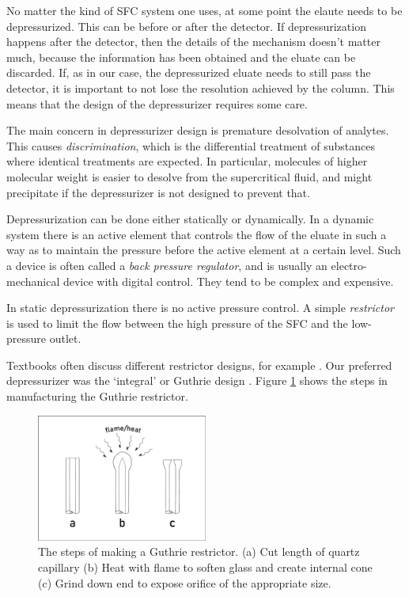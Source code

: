 No matter the kind of SFC system one uses, at some point the elaute needs to be
depressurized. This can be before or after the detector. If depressurization
happens after the detector, then the details of the mechanism doesn't matter
much, because the information has been obtained and the eluate can be
discarded. If, as in our case, the depressurized eluate needs to still pass the
detector, it is important to not lose the resolution achieved by the column.
This means that the design of the depressurizer requires some care.

The main concern in depressurizer design is premature desolvation of analytes. This
causes \textit{discrimination}, which is the differential treatment of
substances where identical treatments are expected. In particular, molecules of
higher molecular weight is easier to desolve from the supercritical fluid, and
might precipitate if the depressurizer is not designed to prevent that.

Depressurization can be done either statically or dynamically. In a dynamic
system there is an active element that controls the flow of the eluate in such a
way as to maintain the pressure before the active element at a certain level.
Such a device is often called a \textit{back pressure regulator}, and is usually
an electro-mechanical device with digital control. They tend to be complex and expensive. 

In static depressurization there is no active pressure control. A simple
\textit{restrictor} is used to limit the flow between the high pressure of the
SFC and the low-pressure outlet. 

Textbooks often discuss different restrictor designs, for example
\autocite{LuquedeCastro1994}. Our preferred depressurizer was the `integral' or
Guthrie design \autocite{Guthrie1986}. Figure \ref{fig:restrictor} shows the steps
in manufacturing the Guthrie restrictor.

\begin{figure}
\centering
\includegraphics[width=0.5\textwidth]{Figures/Restrictor.pdf}
\decoRule

\caption[A diagram of a integral restrictor.]{The steps of making a Guthrie restrictor. (a) Cut
length of quartz capillary (b) Heat with flame to soften glass and create
internal cone (c) Grind down end to expose orifice of the appropriate size.}

\label{fig:restrictor}
\end{figure}

